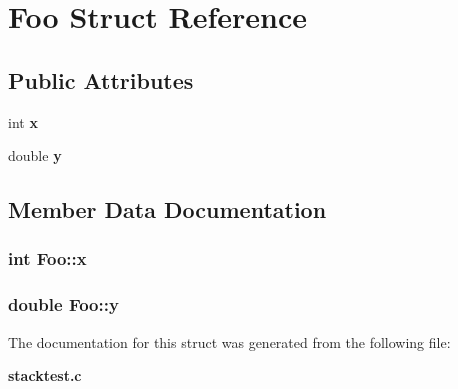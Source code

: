 \section{Foo Struct Reference}
\label{structFoo}
\subsection*{Public Attributes}
\begin{CompactItemize}
\item 
int \bf{x}
\item 
double \bf{y}
\end{CompactItemize}


\subsection{Member Data Documentation}
\subsubsection{\setlength{\rightskip}{0pt plus 5cm}int \bf{Foo::x}}\label{structFoo_16eddb7296c37d91335845d7b847c6b3}


\subsubsection{\setlength{\rightskip}{0pt plus 5cm}double \bf{Foo::y}}\label{structFoo_9b2c09554b5b9ea744e287278243d5cb}




The documentation for this struct was generated from the following file:\begin{CompactItemize}
\item 
\bf{stacktest.c}\end{CompactItemize}
